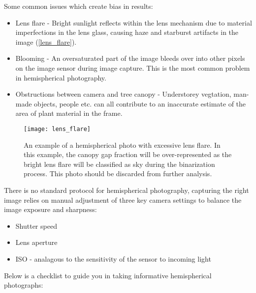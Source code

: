 \documentclass{article}
\begin{document}
Some common issues which create bias in results:

\begin{itemize}
	\item{Lens flare - Bright sunlight reflects within the lens mechanism due to material imperfections in the lens glass, causing haze and starburst artifacts in the image (\autoref{lens_flare}).}
	\item{Blooming - An oversaturated part of the image bleeds over into other pixels on the image sensor during image capture. This is the most common problem in hemispherical photography.}
	\item{Obstructions between camera and tree canopy - Understorey vegtation, man-made objects, people etc. can all contribute to an inaccurate estimate of the area of plant material in the frame.}
\end{itemize}

\begin{figure}[H]
\centering
	\texttt{[image: lens\_flare]}
	\caption{An example of a hemispherical photo with excessive lens flare. In this example, the canopy gap fraction will be over-represented as the bright lens flare will be classified as sky during the binarization process. This photo should be discarded from further analysis.}
	\label{lens_flare}
\end{figure}

There is no standard protocol for hemispherical photography, capturing the right image relies on manual adjustment of three key camera settings to balance the image exposure and sharpness:

\begin{itemize}
	\item{Shutter speed}
	\item{Lens aperture}
	\item{ISO - analagous to the sensitivity of the sensor to incoming light}
\end{itemize}

Below is a checklist to guide you in taking informative hemispherical photographs: 
\end{document}

